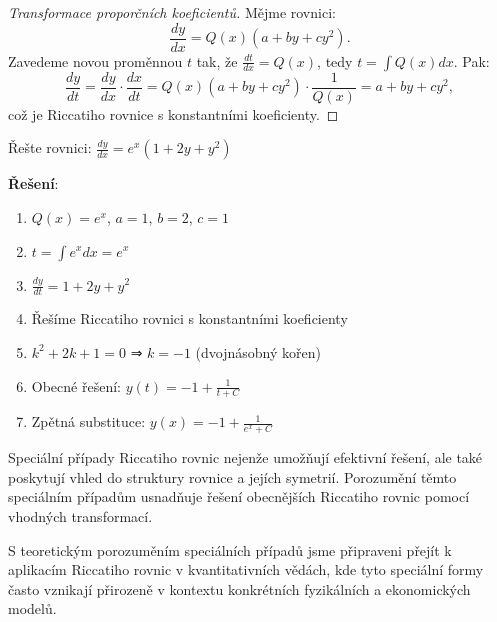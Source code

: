 \begin{proof}[Transformace proporčních koeficientů]
Mějme rovnici:
\[
\frac{dy}{dx} = Q(x)(a + by + cy^2).
\]
Zavedeme novou proměnnou $t$ tak, že $\frac{dt}{dx} = Q(x)$, tedy $t = \int Q(x) dx$.
Pak:
\[
\frac{dy}{dt} = \frac{dy}{dx} \cdot \frac{dx}{dt} = Q(x)(a + by + cy^2) \cdot \frac{1}{Q(x)} = a + by + cy^2,
\]
což je Riccatiho rovnice s konstantními koeficienty.
\end{proof}

\vspace{0.6\baselineskip}

\begin{example}
\label{ex:proporcni-koeficienty}
Řešte rovnici: $\frac{dy}{dx} = e^x(1 + 2y + y^2)$

\textbf{Řešení}:
\begin{enumerate}
\item $Q(x) = e^x$, $a = 1$, $b = 2$, $c = 1$
\item $t = \int e^x dx = e^x$
\item $\frac{dy}{dt} = 1 + 2y + y^2$
\item Řešíme Riccatiho rovnici s konstantními koeficienty
\item $k^2 + 2k + 1 = 0$ ⇒ $k = -1$ (dvojnásobný kořen)
\item Obecné řešení: $y(t) = -1 + \frac{1}{t + C}$
\item Zpětná substituce: $y(x) = -1 + \frac{1}{e^x + C}$
\end{enumerate}
\end{example}

\vspace{0.8\baselineskip}

\begin{remark}
\label{rem:vyznam-specialnich-pripadu}
Speciální případy Riccatiho rovnic nejenže umožňují efektivní řešení, ale také poskytují 
vhled do struktury rovnice a jejích symetrií. Porozumění těmto speciálním případům 
usnadňuje řešení obecnějších Riccatiho rovnic pomocí vhodných transformací.
\end{remark}

\vspace{0.8\baselineskip}

\begin{transition}
S teoretickým porozuměním speciálních případů jsme připraveni přejít k aplikacím 
Riccatiho rovnic v kvantitativních vědách, kde tyto speciální formy často vznikají 
přirozeně v kontextu konkrétních fyzikálních a ekonomických modelů.
\end{transition}


